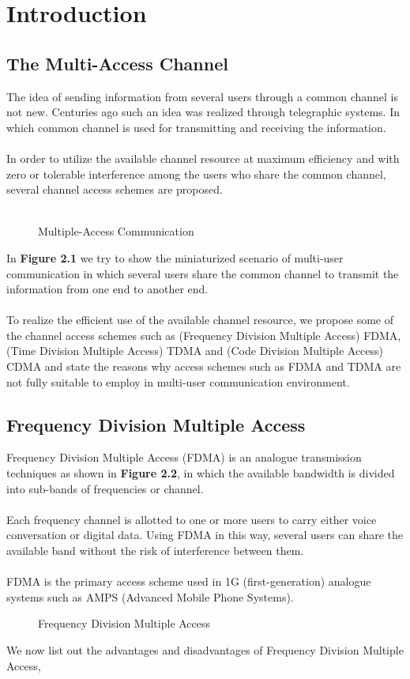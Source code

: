 \chapter{Introduction}
\section{The Multi-Access Channel}
The idea of sending information from several users through a common channel is not new. Centuries ago such an idea was realized through telegraphic systems. In which common channel is used for transmitting and receiving the information. \\ \\
In order to utilize the available channel resource at maximum efficiency and with zero or tolerable interference among the users who share the common channel, several channel access schemes are proposed. \\ \\
\begin{figure}[htb]
  \centerline{  }
  \caption{Multiple-Access Communication}
\end{figure}
In \textbf{Figure 2.1} we try to show the miniaturized scenario of multi-user communication in which several users share the common channel to transmit the information from one end to another end. \\ \\
To realize the efficient use of the available channel resource, we propose some of the channel access schemes such as (Frequency Division Multiple Access) FDMA, (Time Division Multiple Access) TDMA and (Code Division Multiple Access) CDMA and state the reasons why access schemes such as FDMA and TDMA are not fully suitable to employ in multi-user communication environment. 
\section{Frequency Division Multiple Access}
Frequency Division Multiple Access (FDMA) is an analogue transmission techniques as shown in \textbf{Figure 2.2}, in which the available bandwidth is divided into sub-bands of frequencies or channel. \\ \\
Each frequency channel is allotted to one or more users to carry either voice conversation or digital data. Using FDMA in this way, several users can share the available band without the risk of interference between them. \\ \\
FDMA is the primary access scheme used in 1G (first-generation) analogue systems such as AMPS (Advanced Mobile Phone Systems).
\begin{figure}[htb]
  \centerline{  }
  \caption{Frequency Division Multiple Access}
\end{figure}
We now list out the advantages and disadvantages of Frequency Division Multiple Access,
